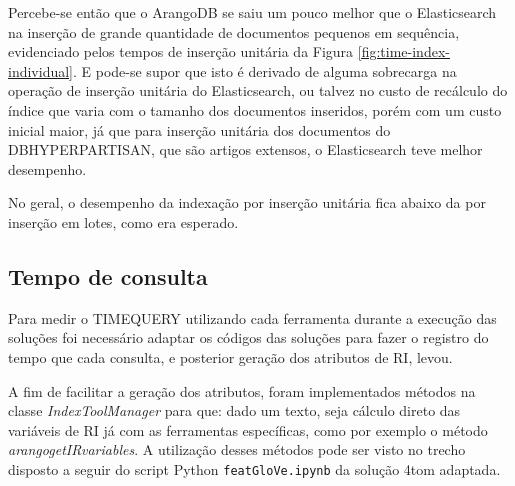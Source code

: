 			Percebe-se então que o ArangoDB se saiu um pouco melhor que o Elasticsearch na inserção de grande quantidade de documentos pequenos em sequência, evidenciado pelos tempos de inserção unitária da Figura \ref{fig:time-index-individual}.
			E pode-se supor que isto é derivado de alguma sobrecarga na operação de inserção unitária do Elasticsearch, ou talvez no custo de recálculo do índice que varia com o tamanho dos documentos inseridos, porém com um custo inicial maior, já que para inserção unitária dos documentos do DB\underscore{}HYPERPARTISAN, que são artigos extensos, o Elasticsearch teve melhor desempenho.
				
			No geral, o desempenho da indexação por inserção unitária fica abaixo da por inserção em lotes, como era esperado.

		\subsection{Tempo de consulta}
			Para medir o TIME\underscore{}QUERY utilizando cada ferramenta durante a execução das soluções foi necessário adaptar os códigos das soluções para fazer o registro do tempo que cada consulta, e posterior geração dos atributos de RI, levou.

			A fim de facilitar a geração dos atributos, foram implementados métodos na classe \textit{IndexToolManager} para que: dado um texto, seja cálculo direto das variáveis de RI já com as ferramentas específicas, como por exemplo o método \textit{arango\underscore{}get\underscore{}IR\underscore{}variables}.
			A utilização desses métodos pode ser visto no trecho disposto a seguir do script Python \texttt{feat\underscore{}GloVe.ipynb} da solução 4\underscore{}tom adaptada.

			\begin{listing}[H]
			\end{listing}
			\vspace{-1.0cm}
			\inputminted[bgcolor=bg, 
			tabsize=4, baselinestretch=1, breaklines]{python}{codes/time-query-calculation-4-tom.py}
			\vspace{-1.0cm}
			\Ididthis

